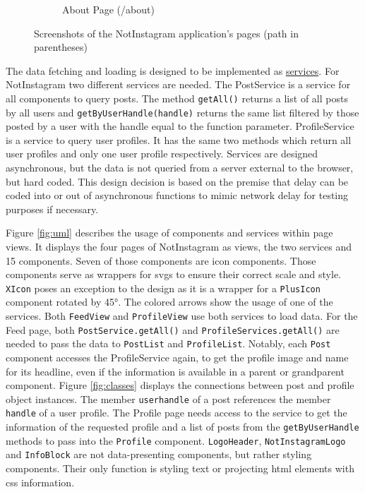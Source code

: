 \documentclass[a4paper, 10pt]{article}
\begin{document}
\begin{figure}[ht!]
\begin{subfigure}{0.49\linewidth}
\begin{center}
    \end{center}
    \caption{About Page (/about)}\label{subfig:about}
  \end{subfigure}
  \caption{Screenshots of the NotInstagram application's pages (path in parentheses)}\label{fig:screenshots}
\end{figure}

The data fetching and loading is designed to be implemented as \hyperref[enum:services]{services}.
For NotInstagram two different services are needed.
The PostService is a service for all components to query posts.
The method \verb|getAll()| returns a list of all posts by all users and \verb|getByUserHandle(handle)| returns the same list filtered by those posted by a user with the handle equal to the function parameter.
ProfileService is a service to query user profiles.
It has the same two methods which return all user profiles and only one user profile respectively.
Services are designed asynchronous, but the data is not queried from a server external to the browser, but hard coded.
This design decision is based on the premise that delay can be coded into or out of asynchronous functions to mimic network delay for testing purposes if necessary.

Figure \ref{fig:uml} describes the usage of components and services within page views.
It displays the four pages of NotInstagram as views, the two services and 15 components.
Seven of those components are icon components.
Those components serve as wrappers for \acrshort{svg}s to ensure their correct scale and style.
\verb|XIcon| poses an exception to the design as it is a wrapper for a \verb|PlusIcon| component rotated by 45°.
The colored arrows show the usage of one of the services.
Both \verb|FeedView| and \verb|ProfileView| use both services to load data.
For the Feed page, both \verb|PostService.getAll()| and \verb|ProfileServices.getAll()| are needed to pass the data to \verb|PostList| and \verb|ProfileList|.
Notably, each \verb|Post| component accesses the ProfileService again, to get the profile image and name for its headline, even if the information is available in a parent or grandparent component.
Figure \ref{fig:classes} displays the connections between post and profile object instances.
The member \verb|userhandle| of a post references the member \verb|handle| of a user profile.
The Profile page needs access to the service to get the information of the requested profile and a list of posts from the \verb|getByUserHandle| methods to pass into the \verb|Profile| component.
\verb|LogoHeader|, \verb|NotInstagramLogo| and \verb|InfoBlock| are not data-presenting components, but rather styling components.
Their only function is styling text or projecting \acrshort{html} elements with \acrshort{css} information.
\end{document}
